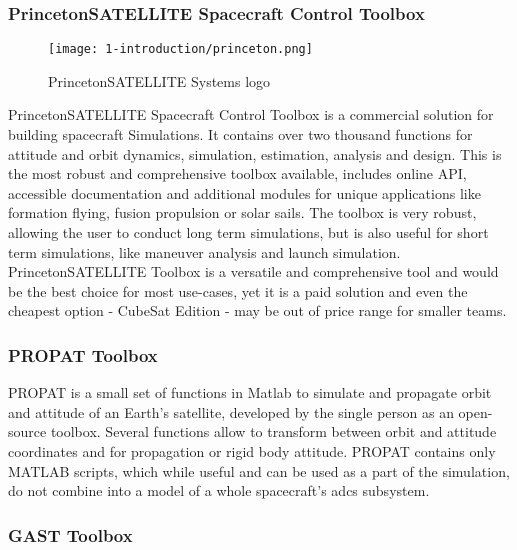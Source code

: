     \subsubsection{PrincetonSATELLITE Spacecraft Control Toolbox}
        \begin{figure}[H]
            \centering
            \texttt{[image: 1-introduction/princeton.png]}
            \caption{PrincetonSATELLITE Systems logo\cite{princetonlogo}}
            \label{fig:princeton}
        \end{figure}
        PrincetonSATELLITE Spacecraft Control Toolbox is a commercial solution for building spacecraft Simulations. It contains over two thousand functions for attitude and orbit dynamics, simulation, estimation, analysis and design. This is the most robust and comprehensive toolbox available, includes online API, accessible documentation and additional modules for unique applications like formation flying, fusion propulsion or solar sails. The toolbox is very robust, allowing the user to conduct long term simulations, but is also useful for short term simulations, like maneuver analysis and launch simulation. PrincetonSATELLITE Toolbox is a versatile and comprehensive tool and would be the best choice for most use-cases, yet it is a paid solution and even the cheapest option - CubeSat Edition - may be out of price range for smaller teams\cite{princeton}.

    \subsubsection{PROPAT Toolbox}
        PROPAT is a small set of functions in Matlab to simulate and propagate orbit and attitude of an Earth's satellite, developed by the single person as an open-source toolbox. Several functions allow to transform between orbit and attitude coordinates and for propagation or rigid body attitude. PROPAT contains only MATLAB scripts, which while useful and can be used as a part of the simulation, do not combine into a model of a whole spacecraft's \ac{adcs} subsystem\cite{propat}.

    \subsubsection{GAST Toolbox}


